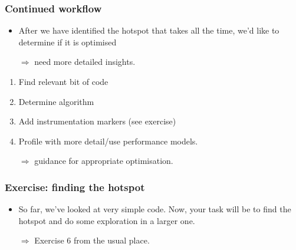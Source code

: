 \documentclass[dvipsnames,presentation,aspectratio=169,14pt]{beamer}
\begin{document}
\begin{frame}
  \frametitle{Continued workflow}
  \begin{itemize}
  \item After we have identified the hotspot that takes all the time,
    we'd like to determine if it is optimised
  \item[$\Rightarrow$] need more detailed insights.
  \end{itemize}
  \begin{enumerate}
  \item Find relevant bit of code
  \item Determine algorithm
  \item Add instrumentation markers (see exercise)
  \item Profile with more detail/use performance models.
  \item[$\Rightarrow$] guidance for appropriate optimisation.
  \end{enumerate}
\end{frame}
\begin{frame}
  \frametitle{Exercise: finding the hotspot}
  \begin{itemize}
  \item So far, we've looked at very simple code. Now, your task will
    be to find the hotspot and do some exploration in a larger one.
  \item[$\Rightarrow$] Exercise 6 from the usual place.
  \end{itemize}
\end{frame}
\end{document}
